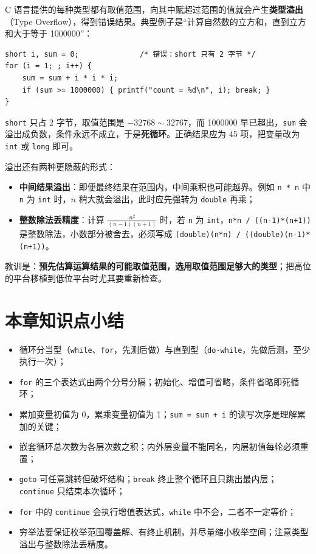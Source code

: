 C 语言提供的每种类型都有取值范围，向其中赋超过范围的值就会产生\textbf{类型溢出}（Type Overflow），得到错误结果。典型例子是“计算自然数的立方和，直到立方和大于等于 1000000”：

\begin{lstlisting}
short i, sum = 0;              /* 错误：short 只有 2 字节 */
for (i = 1; ; i++) {
    sum = sum + i * i * i;
    if (sum >= 1000000) { printf("count = %d\n", i); break; }
}
\end{lstlisting}

\texttt{short} 只占 2 字节，取值范围是 $-32768 \sim 32767$，而 1000000 早已超出，\texttt{sum} 会溢出成负数，条件永远不成立，于是\textbf{死循环}。正确结果应为 45 项，把变量改为 \texttt{int} 或 \texttt{long} 即可。

溢出还有两种更隐蔽的形式：

\begin{itemize}
  \item \textbf{中间结果溢出}：即便最终结果在范围内，中间乘积也可能越界。例如 \texttt{n * n} 中 \texttt{n} 为 \texttt{int} 时，$n$ 稍大就会溢出，此时应先强转为 \texttt{double} 再乘；
  \item \textbf{整数除法丢精度}：计算 $\frac{n^{2}}{(n-1)(n+1)}$ 时，若 \texttt{n} 为 \texttt{int}，\texttt{n*n / ((n-1)*(n+1))} 是整数除法，小数部分被舍去，必须写成 \texttt{(double)(n*n) / ((double)(n-1)*(n+1))}。
\end{itemize}

教训是：\textbf{预先估算运算结果的可能取值范围，选用取值范围足够大的类型}；把高位的平台移植到低位平台时尤其要重新检查。

\section{本章知识点小结}

\begin{itemize}
  \item 循环分当型（\texttt{while}、\texttt{for}，先测后做）与直到型（\texttt{do-while}，先做后测，至少执行一次）；
  \item \texttt{for} 的三个表达式由两个分号分隔；初始化、增值可省略，条件省略即死循环；
  \item 累加变量初值为 0，累乘变量初值为 1；\texttt{sum = sum + i} 的读写次序是理解累加的关键；
  \item 嵌套循环总次数为各层次数之积；内外层变量不能同名，内层初值每轮必须重置；
  \item \texttt{goto} 可任意跳转但破坏结构；\texttt{break} 终止整个循环且只跳出最内层；\texttt{continue} 只结束本次循环；
  \item \texttt{for} 中的 \texttt{continue} 会执行增值表达式，\texttt{while} 中不会，二者不一定等价；
  \item 穷举法要保证枚举范围覆盖解、有终止机制，并尽量缩小枚举空间；注意类型溢出与整数除法丢精度。
\end{itemize}

